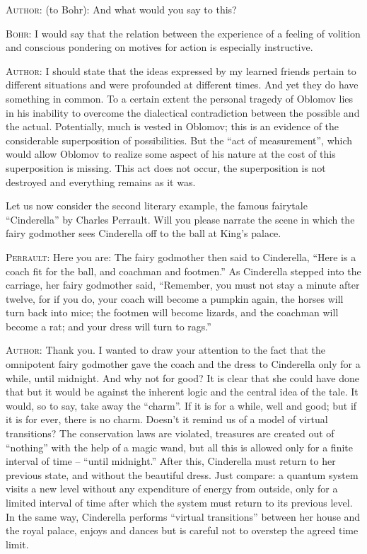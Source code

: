 \documentclass[a4paper,sfsidenotes,colorlinks=true]{tufte-book}
\numberwithin{equation}{section}
\numberwithin{figure}{section}
\begin{document}
\textsc{Author:} (to Bohr): And what would
you say to this?  

\textsc{Bohr:} I would say that the relation between the experience
of a feeling of volition and conscious pondering on motives for action
is especially instructive.  


\textsc{Author:} I should state that the ideas expressed by my learned
friends pertain to different situations and were profounded at
different times. And yet they do have something in common. To a
certain extent the personal tragedy of Oblomov lies in his inability
to overcome the dialectical contradiction between the possible and the
actual. Potentially, much is vested in Oblomov; this is an evidence of
the considerable superposition of possibilities. But the ``act of
measurement'', which would allow Oblomov to realize some aspect of his
nature at the cost of this superposition is missing. This act does
not occur, the superposition is not destroyed and everything remains
as it was.

Let us now consider the second literary example, the famous fairytale
``Cinderella'' by Charles Perrault. Will you please narrate the scene
in which the fairy godmother sees Cinderella off to the ball at King's
palace.


\textsc{Perrault:} Here you are: The fairy godmother then said to
Cinderella, ``Here is a coach fit for the ball, and coachman and
footmen.'' As Cinderella stepped into the carriage, her fairy godmother
said, ``Remember, you must not stay a minute after twelve, for if you
do, your coach will become a pumpkin again, the horses will turn back
into mice; the footmen will become lizards, and the coachman will
become a rat; and your dress will turn to rags.''


\textsc{Author:} Thank you. I wanted to draw your attention to the
fact that the omnipotent fairy godmother gave the coach and the dress
to Cinderella only for a while, until midnight. And why not for good?
It is clear that she could have done that but it would be against the
inherent logic and the central idea of the tale. It would, so to say,
take away the ``charm''. If it is for a while, well and good; but if
it is for ever, there is no charm. Doesn't it remind us of a model of
virtual transitions? The conservation laws are violated, treasures are
created out of ``nothing'' with the help of a magic wand, but all this
is allowed only for a finite interval of time -- ``until midnight.'' After
this, Cinderella must return to her previous state, and without the
beautiful dress. Just compare: a quantum system visits a new level
without any expenditure of energy from outside, only for a limited
interval of time after which the system must return to its previous
level. In the same way, Cinderella performs ``virtual transitions''
between her house and the royal palace, enjoys and dances but is
careful not to overstep the agreed time limit. 
\end{document}
